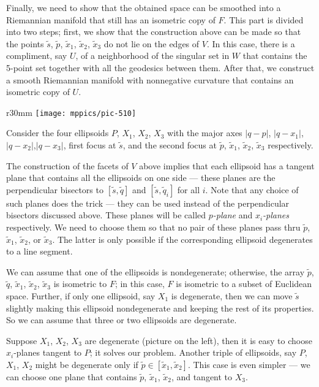 \documentclass{article}
\begin{document}
\medskip

Finally, we need to show that the obtained space can be smoothed into a Riemannian manifold that still has an isometric copy of $F$.
This part is divided into two steps; first, we show that the construction above can be made so that the points $\tilde s$, $\tilde p$, $\tilde x_1$, $\tilde x_2$, $\tilde x_3$ do not lie on the edges of $V$.
In this case, there is a compliment, say $U$, of a neighborhood of the singular set in $W$ that contains
the 5-point set together with all the geodesics between them.
After that, we construct a smooth Riemannian manifold with nonnegative curvature that contains an isometric copy of $U$.

\begin{wrapfigure}{r}{30mm}
\vskip-0mm
\centering
\texttt{[image: mppics/pic-510]}
\end{wrapfigure}

Consider the four ellipsoids $P$, $X_1$, $X_2$, $X_3$ with the major axes $|q-p|$, $|q-x_1|$, $|q-x_2|$,$|q-x_3|$, first focus at $\tilde s$, and the second focus at $\tilde p$, $\tilde x_1$, $\tilde x_2$, $\tilde x_3$ respectively.

The construction of the facets of $V$ above implies that each ellipsoid has a tangent plane that contains all the ellipsoids on one side --- these planes are the perpendicular bisectors to $[\tilde s,\tilde q]$ and $[\tilde s,\tilde q_i]$ for all $i$.
Note that any choice of such planes does the trick --- they can be used instead of the perpendicular bisectors discussed above.
These planes will be called \emph{$p$-plane} and \emph{$x_i$-planes} respectively.
We need to choose them so that no pair of these planes pass thru $\tilde p$, $\tilde x_1$, $\tilde x_2$, or $\tilde x_3$.
The latter is only possible if the corresponding ellipsoid degenerates to a line segment.

We can assume that one of the ellipsoids is nondegenerate; otherwise, the array $\tilde p$, $\tilde q$, $\tilde x_1$, $\tilde x_2$, $\tilde x_3$ is isometric to $F$;
in this case, $F$ is isometric to a subset of Euclidean space.
Further, if only one ellipsoid, say $X_1$ is degenerate, then we can move $\tilde s$ slightly making this ellipsoid nondegenerate and keeping the rest of its properties.
So we can assume that three or two ellipsoids are degenerate.

Suppose $X_1$, $X_2$, $X_3$ are degenerate (picture on the left), then it is easy to choose $x_i$-planes tangent to $P$; it solves our problem.
Another triple of ellipsoids, say $P$, $X_1$, $X_2$ might be degenerate only if $\tilde p\in[\tilde x_1,\tilde x_2]$.
This case is even simpler --- we can choose one plane that contains $\tilde p$, $\tilde x_1$, $\tilde x_2$, and tangent to $X_3$.
\end{document}
